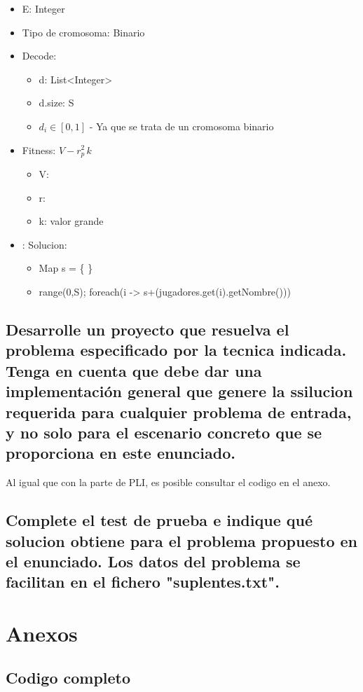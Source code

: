 \documentclass[a4paper,12pt]{article}
\begin{document}
\begin{itemize}
  \item E: Integer
  \item Tipo de cromosoma: Binario
  \item Decode:
  \begin{itemize}
    \item d: List\textless Integer\textgreater
    \item d.size: S
    \item $ d_i \in [0,1] $ - Ya que se trata de un cromosoma binario
  \end{itemize}
  \item Fitness: $V - r_p^2 \,k$
  \begin{itemize}
    \item V:
    \item r:
    \item k: valor grande
  \end{itemize}
  \item: Solucion:
  \begin{itemize}
    \item Map s = \{ \}
    \item range(0,S); foreach(i -> s+(jugadores.get(i).getNombre()))
  \end{itemize}
\end{itemize}



\subsection{Desarrolle un proyecto que resuelva el problema especificado por la tecnica indicada. Tenga en cuenta que debe dar una implementación general que genere la ssilucion requerida para cualquier problema de entrada, y no solo para el escenario concreto que se proporciona en este enunciado.}
Al igual que con la parte de PLI, es posible consultar el codigo en el anexo.
\subsection{Complete el test de prueba e indique qué solucion obtiene para el problema propuesto en el enunciado. Los datos del problema se facilitan en el fichero "suplentes.txt".}

\section{Anexos}
\subsection{Codigo completo}
\end{document}
